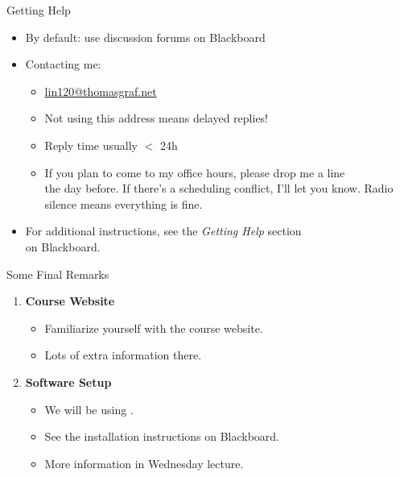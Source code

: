 \documentclass[professionalfonts, xcolor={usenames,svgnames,x11names,table}]{beamer}
\begin{document}
\begin{frame}{Getting Help}
    \begin{itemize}
        \item By default: use discussion forums on Blackboard
        \item Contacting me:
            \begin{itemize}
                \item \url{lin120@thomasgraf.net}
                \item Not using this address means delayed replies!
                \item Reply time usually $<$ 24h
                \item If you plan to come to my office hours, please drop me a line\\
                    the day before.
                    If there's a scheduling conflict, I'll let you know.
                    Radio silence means everything is fine.
            \end{itemize}
        \item For additional instructions, see the \emph{Getting Help} section\\
            on Blackboard.
    \end{itemize}
\end{frame}

\begin{frame}{Some Final Remarks}
    \begin{enumerate}
        \item \textbf{Course Website}
            \begin{itemize}
                \item Familiarize yourself with the course website.
                \item Lots of extra information there.
            \end{itemize}
        \item \textbf{Software Setup}
            \begin{itemize}
                \item We will be using .
                \item See the installation instructions on Blackboard.
                \item More information in Wednesday lecture.
            \end{itemize}
    \end{enumerate}
\end{frame}
\end{document}
